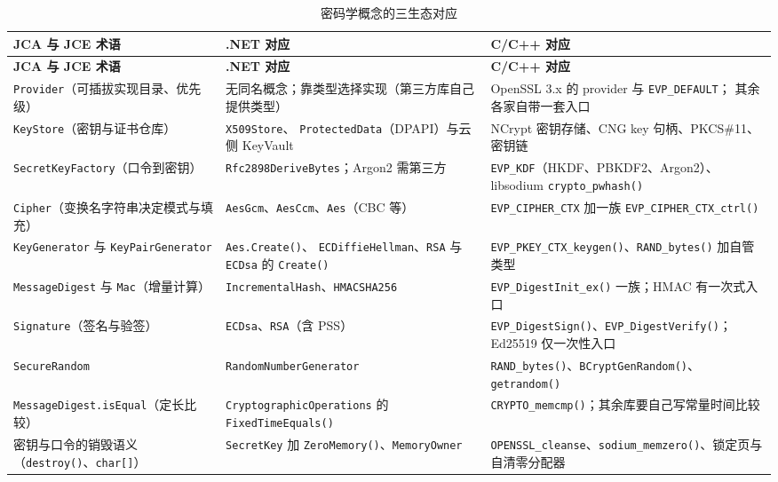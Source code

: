 \documentclass[12pt,a4paper,fontset=fandol]{ctexbook}
\newcommand{\Fn}[1]{\texttt{#1()}}
\newcommand{\Tp}[1]{\texttt{#1}}
\newcommand{\CppJava}{C/C++}
\begin{document}
\begin{scriptsize}
\setlength{\tabcolsep}{3pt}
\begin{longtable}{@{}>{\raggedright\arraybackslash}p{}
                  >{\raggedright\arraybackslash}p{}
                  >{\raggedright\arraybackslash}p{}@{}}
\caption{密码学概念的三生态对应}\\
\toprule
\textbf{JCA 与 JCE 术语} & \textbf{.NET 对应} &
\textbf{\CppJava{} 对应} \\
\midrule
\endfirsthead
\toprule
\textbf{JCA 与 JCE 术语} & \textbf{.NET 对应} &
\textbf{\CppJava{} 对应} \\
\midrule
\endhead
\Tp{Provider}（可插拔实现目录、优先级） &
无同名概念；靠类型选择实现（第三方库自己提供类型） &
OpenSSL 3.x 的 provider 与 \Tp{EVP\_DEFAULT}；
其余各家自带一套入口 \\
\Tp{KeyStore}（密钥与证书仓库） & \Tp{X509Store}、
\Tp{ProtectedData}（DPAPI）与云侧 KeyVault &
NCrypt 密钥存储、CNG key 句柄、PKCS\#11、密钥链 \\
\Tp{SecretKeyFactory}（口令到密钥） &
\Tp{Rfc2898DeriveBytes}；Argon2 需第三方 &
\Tp{EVP\_KDF}（HKDF、PBKDF2、Argon2）、
libsodium \Fn{crypto\_pwhash} \\
\Tp{Cipher}（变换名字符串决定模式与填充） &
\Tp{AesGcm}、\Tp{AesCcm}、\Tp{Aes}（CBC 等） &
\Tp{EVP\_CIPHER\_CTX} 加一族 \Fn{EVP\_CIPHER\_CTX\_ctrl} \\
\Tp{KeyGenerator} 与 \Tp{KeyPairGenerator} & \Tp{Aes.Create()}、
\Tp{ECDiffieHellman}、\Tp{RSA} 与 \Tp{ECDsa} 的 \Fn{Create} &
\Fn{EVP\_PKEY\_CTX\_keygen}、\Fn{RAND\_bytes} 加自管类型 \\
\Tp{MessageDigest} 与 \Tp{Mac}（增量计算） &
\Tp{IncrementalHash}、\Tp{HMACSHA256} &
\Fn{EVP\_DigestInit\_ex} 一族；HMAC 有一次式入口 \\
\Tp{Signature}（签名与验签） & \Tp{ECDsa}、\Tp{RSA}（含 PSS） &
\Fn{EVP\_DigestSign}、\Fn{EVP\_DigestVerify}；
Ed25519 仅一次性入口 \\
\Tp{SecureRandom} & \Tp{RandomNumberGenerator} &
\Fn{RAND\_bytes}、\Fn{BCryptGenRandom}、\Fn{getrandom} \\
\Tp{MessageDigest.isEqual}（定长比较） &
\Tp{CryptographicOperations} 的 \Fn{FixedTimeEquals} &
\Fn{CRYPTO\_memcmp}；其余库要自己写常量时间比较 \\
密钥与口令的销毁语义（\Fn{destroy}、\Tp{char[]}） &
\Tp{SecretKey} 加 \Fn{ZeroMemory}、\Tp{MemoryOwner} &
\Tp{OPENSSL\_cleanse}、\Fn{sodium\_memzero}、锁定页与自清零分配器 \\
\bottomrule
\end{longtable}
\end{scriptsize}
\end{document}
